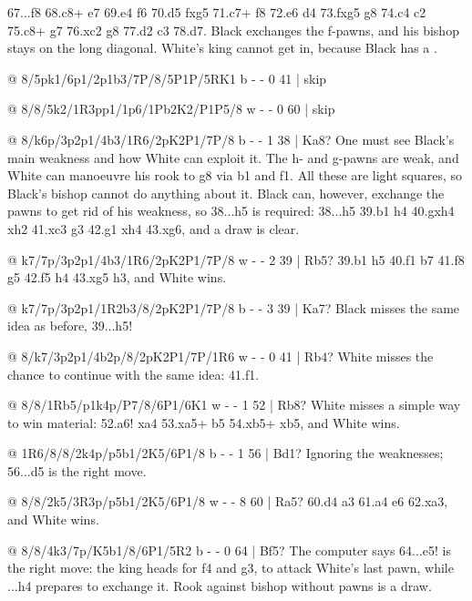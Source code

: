 67...\K f8 68.\R c8+ \K e7 69.\K e4 f6 70.\K d5 fxg5 71.\R c7+ \K f8 72.\K e6 \B d4 73.fxg5 \K g8
74.\R c4 c2 75.\R c8+ \K g7 76.\R xc2 \K g8 77.\R d2 \B c3 78.\R d7. Black exchanges the f-pawns, and
his bishop stays on the long diagonal. White's king cannot get in, because Black has a
.

@ 8/5pk1/6p1/2p1b3/7P/8/5P1P/5RK1 b - - 0 41 | skip

@ 8/8/5k2/1R3pp1/1p6/1Pb2K2/P1P5/8 w - - 0 60 | skip

@ 8/k6p/3p2p1/4b3/1R6/2pK2P1/7P/8 b - - 1 38 | Ka8?
One must see Black's main weakness and how White can exploit it. The h- and g-pawns are weak, and
White can manoeuvre his rook to g8 via b1 and f1. All these are light squares, so Black's bishop
cannot do anything about it. Black can,
however, exchange the pawns to get rid of his weakness, so
38...h5 is required: 38...h5 39.\R b1 h4 40.gxh4 \B xh2 41.\K xc3 \B g3 42.\R g1 \B xh4 43.\R xg6, and a
draw is clear.

@ k7/7p/3p2p1/4b3/1R6/2pK2P1/7P/8 w - - 2 39 | Rb5?
39.\R b1 h5 40.\R f1 \K b7 41.\R f8 g5 42.\R f5 h4 43.\R xg5 h3, and White wins.

@ k7/7p/3p2p1/1R2b3/8/2pK2P1/7P/8 b - - 3 39 | Ka7?
Black misses the same idea as before, 39...h5!

@ 8/k7/3p2p1/4b2p/8/2pK2P1/7P/1R6 w - - 0 41 | Rb4?
White misses the chance to continue with the same idea: 41.\R f1.

@ 8/8/1Rb5/p1k4p/P7/8/6P1/6K1 w - - 1 52 | Rb8?
White misses a simple way to win material: 52.\R a6! \B xa4 53.\R xa5+ \B b5 54.\R xb5+ \K xb5, and White wins.

@ 1R6/8/8/2k4p/p5b1/2K5/6P1/8 b - - 1 56 | Bd1?
Ignoring the weaknesses; 56...\K d5 is the right move.

@ 8/8/2k5/3R3p/p5b1/2K5/6P1/8 w - - 8 60 | Ra5?
60.\R d4 a3 61.\R a4 \B e6 62.\R xa3, and White wins.

@ 8/8/4k3/7p/K5b1/8/6P1/5R2 b - - 0 64 | Bf5?
The computer says 64...\K e5! is the right move: the king heads for f4 and g3, to attack White's last pawn, while ...h4 prepares to exchange it. Rook against bishop without pawns is a draw.

